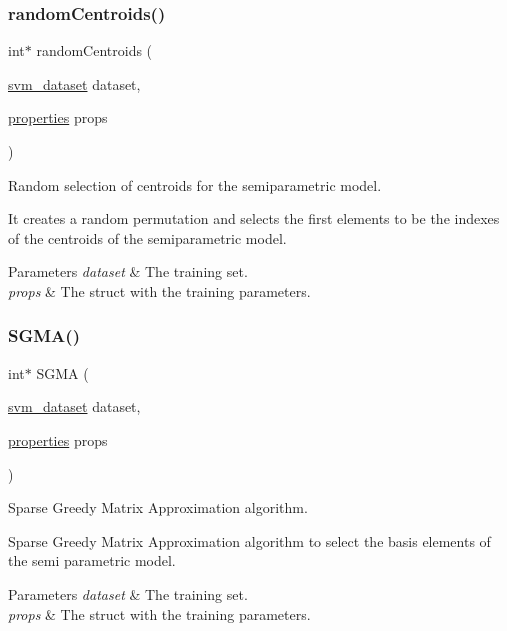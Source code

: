 \subsubsection{\texorpdfstring{random\+Centroids()}{randomCentroids()}}
{\ttfamily int$\ast$ random\+Centroids (\begin{DoxyParamCaption}\item[{\hyperlink{structsvm__dataset}{svm\+\_\+dataset}}]{dataset,  }\item[{\hyperlink{structproperties}{properties}}]{props }\end{DoxyParamCaption})}



Random selection of centroids for the semiparametric model. 

It creates a random permutation and selects the first elements to be the indexes of the centroids of the semiparametric model.


\begin{DoxyParams}{Parameters}
{\em dataset} & The training set. \\
\hline
{\em props} & The struct with the training parameters. \\
\hline
\end{DoxyParams}
\hypertarget{PSIRWLS-train_8h_a50a6e1f36a010feb91db9b9b38679948}{}\label{PSIRWLS-train_8h_a50a6e1f36a010feb91db9b9b38679948} 
\subsubsection{\texorpdfstring{S\+G\+M\+A()}{SGMA()}}
{\ttfamily int$\ast$ S\+G\+MA (\begin{DoxyParamCaption}\item[{\hyperlink{structsvm__dataset}{svm\+\_\+dataset}}]{dataset,  }\item[{\hyperlink{structproperties}{properties}}]{props }\end{DoxyParamCaption})}



Sparse Greedy Matrix Approximation algorithm. 

Sparse Greedy Matrix Approximation algorithm to select the basis elements of the semi parametric model. 
\begin{DoxyParams}{Parameters}
{\em dataset} & The training set. \\
\hline
{\em props} & The struct with the training parameters. \\
\hline
\end{DoxyParams}
